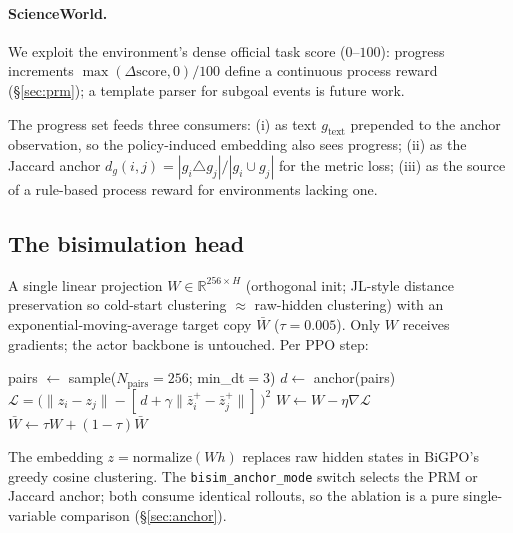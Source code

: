 \documentclass[sigconf]{acmart}
\newcommand{\gtext}{\ensuremath{g_{\text{text}}}}
\begin{document}
\paragraph{ScienceWorld.} We exploit the environment's dense official
task score ($0$--$100$): progress increments
$\max(\Delta\text{score},0)/100$ define a continuous process reward
(\S\ref{sec:prm}); a template parser for subgoal events is future work.

The progress set feeds three consumers: (i) as text $\gtext$ prepended
to the anchor observation, so the policy-induced embedding also sees
progress; (ii) as the Jaccard anchor $d_g(i,j)=|g_i\triangle
g_j|/|g_i\cup g_j|$ for the metric loss; (iii) as the source of a
rule-based process reward for environments lacking one.

\subsection{The bisimulation head}
\label{sec:head}

A single linear projection $W\in\mathbb{R}^{256\times H}$ (orthogonal
init; JL-style distance preservation so cold-start clustering $\approx$
raw-hidden clustering) with an exponential-moving-average target copy
$\bar{W}$ ($\tau=0.005$). Only $W$ receives gradients; the actor
backbone is untouched. Per PPO step:

\begin{algorithm}[H]
\caption{Head update (per PPO step)}
\label{alg:head}
\begin{algorithmic}[1]
 
  \State pairs $\leftarrow$ sample($N_{\text{pairs}}{=}256$; min\_dt${=}3$)
  \State $d \leftarrow$ anchor(pairs) 
   
    \State $\mathcal{L} = \big(\|z_i-z_j\| - [\,d + \gamma\|\bar{z}_i^{+}-\bar{z}_j^{+}\|]\,\big)^2$
    \State $W \leftarrow W - \eta\nabla\mathcal{L}$ 
  \EndFor
\EndFor
\State $\bar{W} \leftarrow \tau W + (1-\tau)\bar{W}$
\end{algorithmic}
\end{algorithm}

The embedding $z=\mathrm{normalize}(Wh)$ replaces raw hidden states in
BiGPO's greedy cosine clustering. The \texttt{bisim\_anchor\_mode}
switch selects the PRM or Jaccard anchor; both consume identical
rollouts, so the ablation is a pure single-variable comparison
(\S\ref{sec:anchor}).
\end{document}
